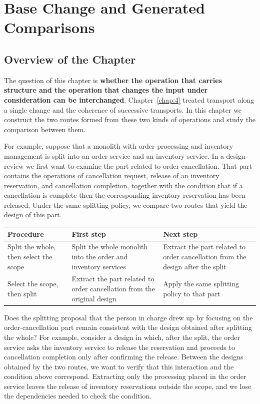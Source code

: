 \chapter{Base Change and Generated Comparisons}\label{chap:5}

\section*{Overview of the Chapter}

The question of this chapter is \textbf{whether the operation that carries structure and the
operation that changes the input under consideration can be interchanged}.
Chapter~\ref{chap:4} treated transport along a single change and the coherence of successive
transports. In this chapter we construct the two routes formed from these two kinds of
operations and study the comparison between them.

For example, suppose that a monolith with order processing and inventory management is split
into an order service and an inventory service. In a design review we first want to examine
the part related to order cancellation. That part contains the operations of cancellation
request, release of an inventory reservation, and cancellation completion, together with the
condition that if a cancellation is complete then the corresponding inventory reservation has
been released. Under the same splitting policy, we compare two routes that yield the design of
this part.

\begin{xltabular}{\linewidth}{@{}LLL@{}}
\toprule
Procedure & First step & Next step \\
\midrule
\endhead
Split the whole, then select the scope & Split the whole monolith into the order and inventory
services & Extract the part related to order cancellation from the design after the split \\
\addlinespace[3pt]
Select the scope, then split & Extract the part related to order cancellation from the
original design & Apply the same splitting policy to that part \\
\bottomrule
\end{xltabular}

Does the splitting proposal that the person in charge drew up by focusing on the order-cancellation
part remain consistent with the design obtained after splitting the whole? For example,
consider a design in which, after the split, the order service asks the inventory service to
release the reservation and proceeds to cancellation completion only after confirming the
release. Between the designs obtained by the two routes, we want to verify that this
interaction and the condition above correspond. Extracting only the processing placed in the
order service leaves the release of inventory reservations outside the scope, and we lose the
dependencies needed to check the condition.

